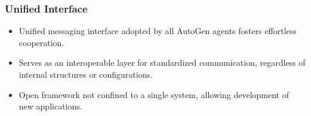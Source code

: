 	
	




\begin{frame}[fragile]\frametitle{Unified Interface}
  \begin{itemize}
    \item Unified messaging interface adopted by all AutoGen agents fosters effortless cooperation.
    \item Serves as an interoperable layer for standardized communication, regardless of internal structures or configurations.
    \item Open framework not confined to a single system, allowing development of new applications.
  \end{itemize}
\end{frame}

